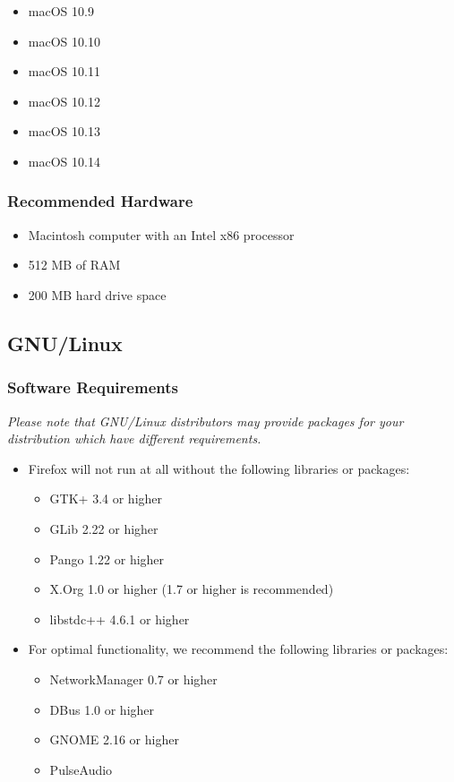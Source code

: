 \documentclass{article}
\begin{document}
\begin{itemize}
	\item macOS 10.9
	\item macOS 10.10
	\item macOS 10.11
	\item macOS 10.12
	\item macOS 10.13
	\item macOS 10.14
\end{itemize}

\subsubsection*{Recommended Hardware}\label{recommended-hardware_1}

\begin{itemize}
	\item Macintosh computer with an Intel x86 processor
	\item 512 MB of RAM
	\item 200 MB hard drive space
\end{itemize}

\subsection*{GNU/Linux}\label{gnulinux}

\subsubsection*{Software Requirements}\label{software-requirements}

\emph{Please note that GNU/Linux distributors may provide packages for your
	distribution which have different requirements.}

\begin{itemize}
	\item Firefox will not run at all without the following libraries or packages:

	      \begin{itemize}
		      \item GTK+ 3.4 or higher
		      \item GLib 2.22 or higher
		      \item Pango 1.22 or higher
		      \item X.Org 1.0 or higher (1.7 or higher is recommended)
		      \item libstdc++ 4.6.1 or higher
	      \end{itemize}
	\item For optimal functionality, we recommend the following libraries or
	      packages:

	      \begin{itemize}
		      \item NetworkManager 0.7 or higher \index{\item}\index{\item}\item DBus 1.0 or
		            higher
		      \item GNOME 2.16 or higher
		      \item PulseAudio
	      \end{itemize}
\end{itemize}
\end{document}
